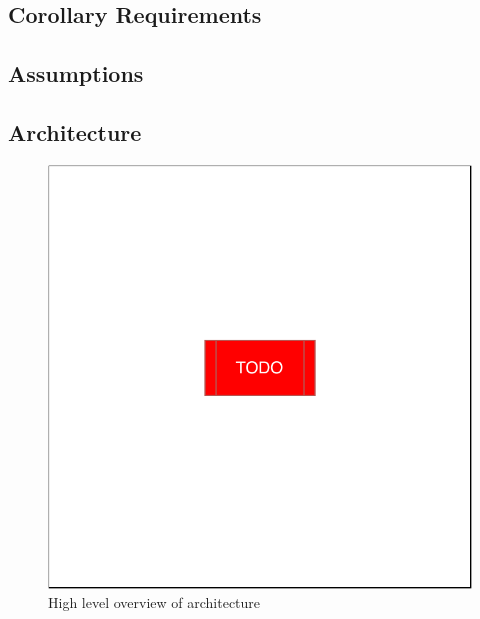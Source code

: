 \subsection{Corollary Requirements} \label{subsubsec:corollary-reqs}

\subsection{Assumptions}\label{subsec:assumptions}
\subsection{Architecture} \label{subsec:arch}

\begin{figure}[h]
    \centering
    \includegraphics[width=0.8 \linewidth]{./diagrams/TODO.pdf} 
    \caption{High level overview of \afg architecture}
    \label{fig:arch-overview}
\end{figure}

